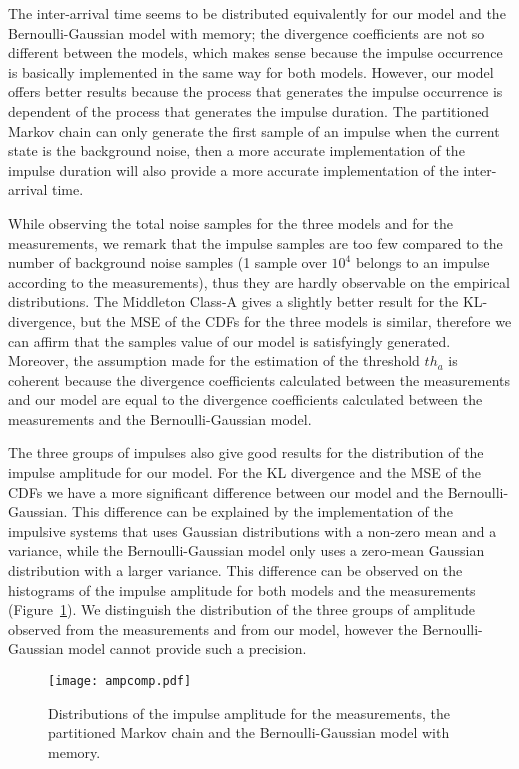 \documentclass[journal]{IEEEtran}
\begin{document}
The inter-arrival time seems to be distributed equivalently for our model and the Bernoulli-Gaussian model with memory; the divergence coefficients are not so different between the models, which makes sense because the impulse occurrence is basically implemented in the same way for both models. However, our model offers better results because the process that generates the impulse occurrence is dependent of the process that generates the impulse duration. The partitioned Markov chain can only generate the first sample of an impulse when the current state is the background noise, then a more accurate implementation of the impulse duration will also provide a more accurate implementation of the inter-arrival time.\

While observing the total noise samples for the three models and for the measurements, we remark that the impulse samples are too few compared to the number of background noise samples (1 sample over $10^4$ belongs to an impulse according to the measurements), thus they are hardly observable on the empirical distributions. The Middleton Class-A gives a slightly better result for the KL-divergence, but the MSE of the CDFs for the three models is similar, therefore we can affirm that the samples value of our model is satisfyingly generated. Moreover, the assumption made for the estimation of the threshold $th_a$ is coherent because the divergence coefficients calculated between the measurements and our model are equal to the divergence coefficients calculated between the measurements and the Bernoulli-Gaussian model.\

The three groups of impulses also give good results for the distribution of the impulse amplitude for our model. For the KL divergence and the MSE of the CDFs we have a more significant difference between our model and the Bernoulli-Gaussian. This difference can be explained by the implementation of the impulsive systems that uses Gaussian distributions with a non-zero mean and a variance, while the Bernoulli-Gaussian model only uses a zero-mean Gaussian distribution with a larger variance. This difference can be observed on the histograms of the impulse amplitude for both models and the measurements (Figure~\ref{AMPCOMP}). We distinguish the distribution of the three groups of amplitude observed from the measurements and from our model, however the Bernoulli-Gaussian model cannot provide such a precision.\
\begin{figure}
\texttt{[image: ampcomp.pdf]}\\
  \caption{Distributions of the impulse amplitude for the measurements, the partitioned Markov chain and the Bernoulli-Gaussian model with memory.}\label{AMPCOMP}
\end{figure}
\end{document}
